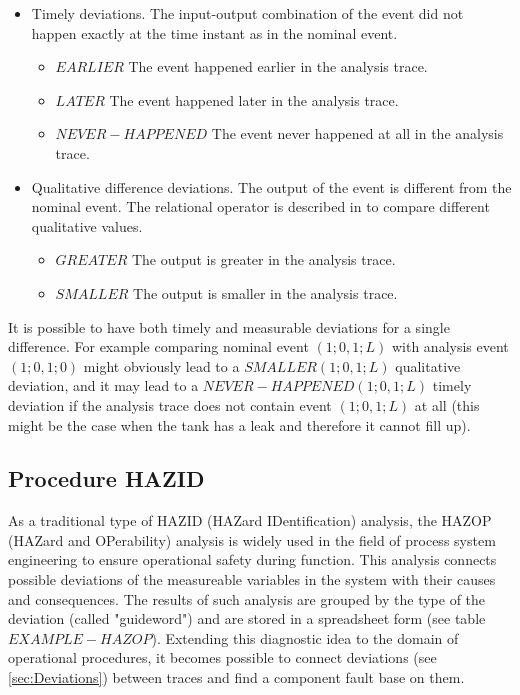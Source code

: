 \documentclass[conference]{IEEEtran}
\begin{document}
\begin{itemize}
\item Timely deviations. The input-output combination of the event did not happen exactly at the time instant as in the nominal event. 
	\begin{itemize}
	  \item $EARLIER$ The event happened earlier in the analysis trace.
	  \item $LATER$ The event happened later in the analysis trace.
	  \item $NEVER-HAPPENED$ The event never happened at all in the analysis trace.
	\end{itemize}
\item Qualitative difference deviations. The output of the event is different from the nominal event. The relational operator is described in \cite{QUALCAL} to compare different qualitative values.
	\begin{itemize}
	  \item $GREATER$ The output is greater in the analysis trace.
	  \item $SMALLER$ The output is smaller in the analysis trace.
	\end{itemize}
\end{itemize}

It is possible to have both timely and measurable deviations for a single difference. For example comparing nominal event $(1;0,1;L)$ with analysis event $(1;0,1;0)$ might obviously lead to a $SMALLER(1;0,1;L)$ qualitative deviation, and it may lead to a $NEVER-HAPPENED(1;0,1;L)$ timely deviation if the analysis trace does not contain event $(1;0,1;L)$ at all (this might be the case when the tank has a leak and therefore it cannot fill up).

\subsection{Procedure HAZID}

As a traditional type of HAZID (HAZard IDentification) analysis, the HAZOP (HAZard and OPerability) analysis is widely used in the field of process system engineering to ensure operational safety during function. This analysis connects possible deviations of the measureable variables in the system with their causes and consequences. The results of such analysis are grouped by the type of the deviation (called "guideword") and are stored in a spreadsheet form (see table $EXAMPLE-HAZOP$). Extending this diagnostic idea to the domain of operational procedures, it becomes possible to connect deviations (see \ref{sec:Deviations}) between traces and find a component fault base on them.
\end{document}
